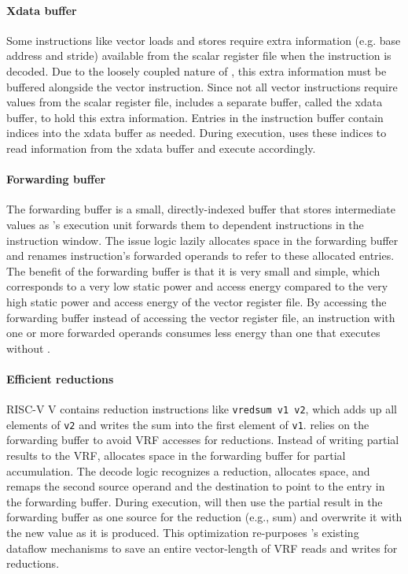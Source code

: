 \paragraph{Xdata buffer}
Some instructions like vector loads and stores require extra information 
(e.g. base address and stride) available from the scalar register file when the instruction is decoded.
%
Due to the loosely coupled nature of \manic, this extra information must be buffered 
alongside the vector instruction.
%
Since not all vector instructions require values from the scalar register file, 
\manic includes a separate buffer, called the xdata buffer, to hold this extra
information.
%
Entries in the instruction buffer contain indices into the xdata buffer as needed.
%
During execution, \manic uses these indices to read information from the xdata buffer and execute accordingly.

\paragraph{Forwarding buffer} The forwarding buffer is a small, directly-indexed
buffer that stores intermediate values as \manic's execution unit forwards them to
dependent instructions in the instruction window. 
%
The issue logic lazily allocates space in the forwarding buffer and renames instruction's forwarded operands to refer to these allocated entries.
%
The benefit of the forwarding buffer is that it is very small and simple, which
corresponds to a very low static power and access energy compared to the very 
high static power and access energy of the vector register file.
%
By accessing the forwarding buffer instead of accessing the vector register
file, an instruction with one or more forwarded operands consumes less energy
than one that executes without \manic. 

\paragraph{Efficient reductions}
RISC-V V contains {reduction} instructions like \texttt{vredsum v1 v2},
which adds up all elements of \texttt{v2} and writes the sum into the first element of \texttt{v1}.
%
\manic relies on the forwarding buffer to avoid VRF accesses for reductions.
% 
Instead of writing partial results to the VRF,
\manic allocates space in the forwarding buffer for partial accumulation.
% 
The decode logic recognizes a reduction, allocates space, and remaps the second source operand and the destination to point to the entry in the forwarding buffer.
% 
During execution, \manic will then use the partial result in the forwarding buffer as one source for the reduction (e.g., sum)
and overwrite it with the new value as it is produced.
% 
This optimization re-purposes \manic's existing dataflow mechanisms
to save an entire vector-length of VRF reads and writes for reductions.

